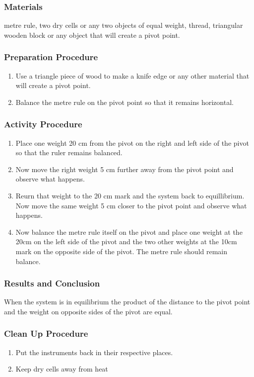 \subsubsection*{Materials}
metre rule, two dry cells or any two objects of equal weight, thread, triangular wooden block or any object that will create a pivot point.  

\subsubsection*{Preparation Procedure}
\begin{enumerate}
\item{Use a triangle piece of wood to make a knife edge or any other material that will create a pivot point.} 
\item{Balance the metre rule on the pivot point so that it remains horizontal.} 
\end{enumerate}

\subsubsection*{Activity Procedure}
\begin{enumerate}
\item{Place one weight 20 cm from the pivot on the right and left side of the pivot so that the ruler remains balanced.} 
\item{Now move the right weight 5 cm further away from the pivot point and observe what happens.} 
\item{Reurn that weight to the 20 cm mark and the system back to equillibrium. Now move the same weight 5 cm closer to the pivot point and observe what happens.} 
\item{Now balance the metre rule itself on the pivot and place one weight at the 20cm on the left side of the pivot and the two other weights at the 10cm mark on the opposite side of the pivot. The metre rule should remain balance.} 
\end{enumerate}

\subsubsection*{Results and Conclusion}
When the system is in equilibrium the product of the distance to the pivot point and the weight on opposite sides of the pivot are equal.  

\subsubsection*{Clean Up Procedure}
\begin{enumerate}
\item{Put the instruments back in their respective places.} 
\item{Keep dry cells away from heat}
\end{enumerate}

